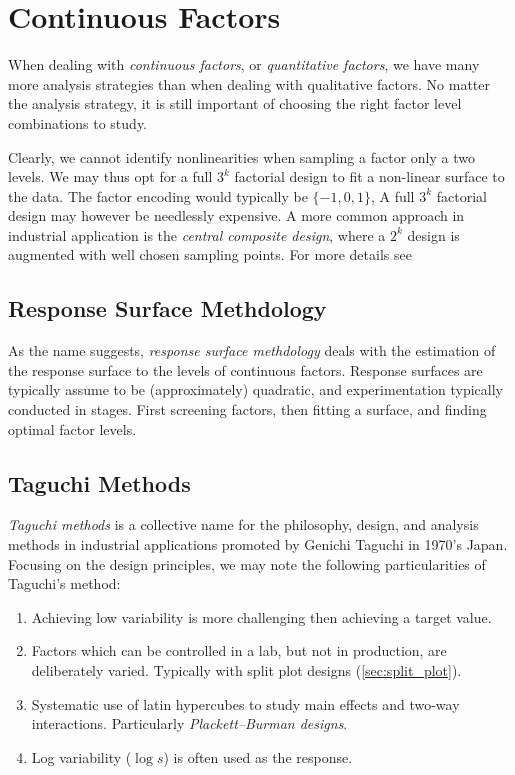 \section{Continuous Factors}
When dealing with \emph{continuous factors}, or \emph{quantitative factors}, we have many more analysis strategies than when dealing with qualitative factors.
No matter the analysis strategy, it is still important of choosing the right factor level combinations to study.

Clearly, we cannot identify nonlinearities when sampling a factor only a two levels.
We may thus opt for a full $3^k$ factorial design to fit a non-linear surface to the data.
The factor encoding would typically be $\{-1,0,1\}$,
A full $3^k$ factorial design may however be needlessly expensive. 
A more common approach in industrial application is the \emph{central composite design}, where a $2^k$ design is augmented with well chosen sampling points. 
For more details see \cite[Sec.6.6]{cox_theory_2000}


\subsection{Response Surface Methdology}
\label{sec:response_surface}
As the name suggests, \emph{response surface methdology} deals with the estimation of the response surface to the levels of continuous factors.
Response surfaces are typically assume to be (approximately) quadratic, and experimentation typically conducted in stages. First screening factors, then fitting a surface, and finding optimal factor levels.



\subsection{Taguchi Methods}
\emph{Taguchi methods} is a collective name for the philosophy, design, and analysis methods in industrial applications promoted by Genichi Taguchi in 1970's Japan.
Focusing on the design principles, we may note the following particularities of Taguchi's method:
\begin{enumerate}
\item Achieving low variability is more challenging then achieving a target value. 
\item Factors which can be controlled in a lab, but not in production, are deliberately varied. Typically with split plot  designs (\ref{sec:split_plot}).
\item Systematic use of latin hypercubes to study main effects and two-way interactions. Particularly \emph{Plackett–Burman designs}.
\item Log variability ($\log s$) is often used as the response.
\end{enumerate}





